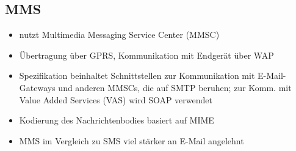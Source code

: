 \documentclass[german,12pt,a4paper]{article}
\begin{document}
\subsection{MMS}
\begin{itemize}
	\item nutzt Multimedia Messaging Service Center (MMSC)
	\item Übertragung über GPRS, Kommunikation mit Endgerät über WAP
	\item Spezifikation beinhaltet Schnittstellen zur Kommunikation mit E-Mail-Gateways und anderen MMSCs, die auf 
		SMTP beruhen; zur Komm. mit Value Added Services (VAS) wird SOAP verwendet
	\item Kodierung des Nachrichtenbodies basiert auf MIME
	\item MMS im Vergleich zu SMS viel stärker an E-Mail angelehnt
\end{itemize}
\end{document}
